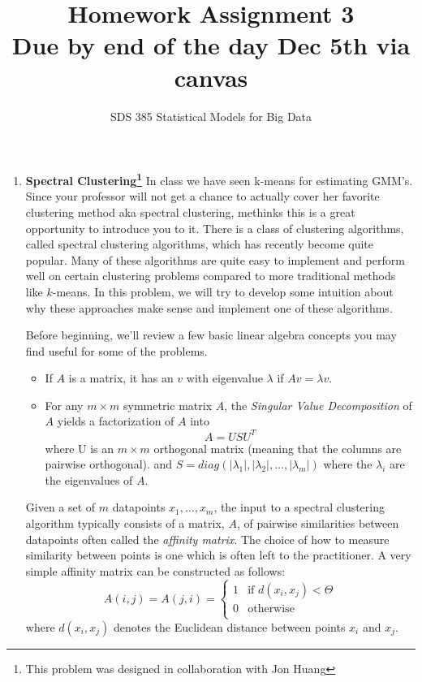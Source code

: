 \documentclass[11pt]{article}
\begin{document}
\title{{\bf Homework Assignment 3\\
Due by end of the day Dec 5th via canvas}}
\author{SDS 385 Statistical Models for Big Data}

\date{}

\maketitle{}
\begin{enumerate}
\item \textbf{Spectral Clustering\footnote{This problem was designed in collaboration with Jon Huang}}
In class we have seen k-means for estimating GMM's. Since your professor will not get a chance to actually cover her favorite clustering method aka spectral clustering, methinks this is a great opportunity to introduce you to it.
There is a class of clustering algorithms, called 
spectral clustering algorithms, which has recently 
become quite popular.  Many of these algorithms are 
quite easy to implement and perform well on 
certain clustering problems compared to more traditional 
methods like $k$-means.  In this problem, we will try to 
develop some intuition about why these approaches
make sense and implement one of these algorithms.

Before beginning, we'll review a few basic linear
algebra concepts you may find useful for some
of the problems.
\begin{itemize}
\item If $A$ is a matrix, it has an 
$v$ with eigenvalue $\lambda$ if $Av=\lambda v$.
\item For any $m\times m$ symmetric matrix $A$, 
the \emph{Singular Value Decomposition} of $A$ yields a 
factorization of $A$ into
\[
A = USU^T
\]
where U is an $m\times m$ orthogonal matrix 
(meaning that the columns are pairwise orthogonal).
and $S=diag(|\lambda_1|,|\lambda_2|,\dots,|\lambda_m|)$ 
where the $\lambda_i$ are the eigenvalues of $A$. 
\end{itemize}

Given a set of $m$ datapoints $x_1,\dots,x_m$,
the input to a spectral clustering algorithm typically
consists of a matrix, $A$, of pairwise similarities between
datapoints often called the \emph{affinity matrix}.  The choice of
how to measure similarity between points is one which is often left 
to the practitioner.  A very simple affinity matrix can be
constructed as follows:
\begin{equation}
\label{aff-eqn}
A(i,j)=A(j,i)=\left\{ \begin{array}{cc} 1 & \mbox{if $d(x_i,x_j)<\Theta$} \\
0 & \mbox{otherwise} \\
\end{array}\right.
\end{equation}
where $d(x_i,x_j)$ denotes the Euclidean distance 
between points $x_i$ and $x_j$.


\end{enumerate}
\end{document}
